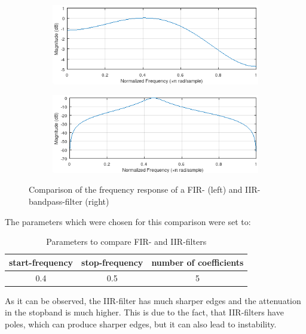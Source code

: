 \begin{figure}[!h]
    \centering
    \begin{subfigure}[c]{0.49\textwidth}
        \centering
        \includegraphics[width=\textwidth]{img/fir_bandpass.png}
    \end{subfigure}
    \begin{subfigure}[c]{0.49\textwidth}
        \centering
        \includegraphics[width=\textwidth]{img/iir_bandpass.png}
    \end{subfigure}
    \caption{Comparison of the frequency response of a \ac{FIR}- (left) and \ac{IIR}-bandpass-filter (right)}
    \label{fig:fir-iir-compare}
\end{figure}

The parameters which were chosen for this comparison were set to:

\begin{table}[!h]
    \centering
    \caption{Parameters to compare \ac{FIR}- and \ac{IIR}-filters}
    \label{table:compare-filters}
    \begin{tabular}{c | c | c }
        start-frequency & stop-frequency & number of coefficients \\
        \hline
        0.4 & 0.5 & 5
    \end{tabular}
\end{table}

As it can be observed, the \ac{IIR}-filter has much sharper edges and the attenuation in the stopband is much higher.
This is due to the fact, that \ac{IIR}-filters have poles, which can produce sharper edges, but it can also lead to
instability.

